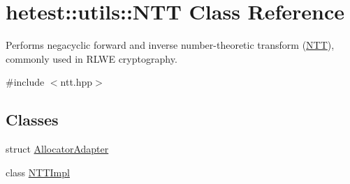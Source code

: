 \hypertarget{classhetest_1_1utils_1_1NTT}{\section{hetest\-:\-:utils\-:\-:N\-T\-T Class Reference}
\label{classhetest_1_1utils_1_1NTT}
}


Performs negacyclic forward and inverse number-\/theoretic transform (\hyperlink{classhetest_1_1utils_1_1NTT}{N\-T\-T}), commonly used in R\-L\-W\-E cryptography.  




{\ttfamily \#include $<$ntt.\-hpp$>$}

\subsection*{Classes}
\begin{DoxyCompactItemize}
\item 
struct \hyperlink{structhetest_1_1utils_1_1NTT_1_1AllocatorAdapter}{Allocator\-Adapter}
\item 
class \hyperlink{classhetest_1_1utils_1_1NTT_1_1NTTImpl}{N\-T\-T\-Impl}
\end{DoxyCompactItemize}
